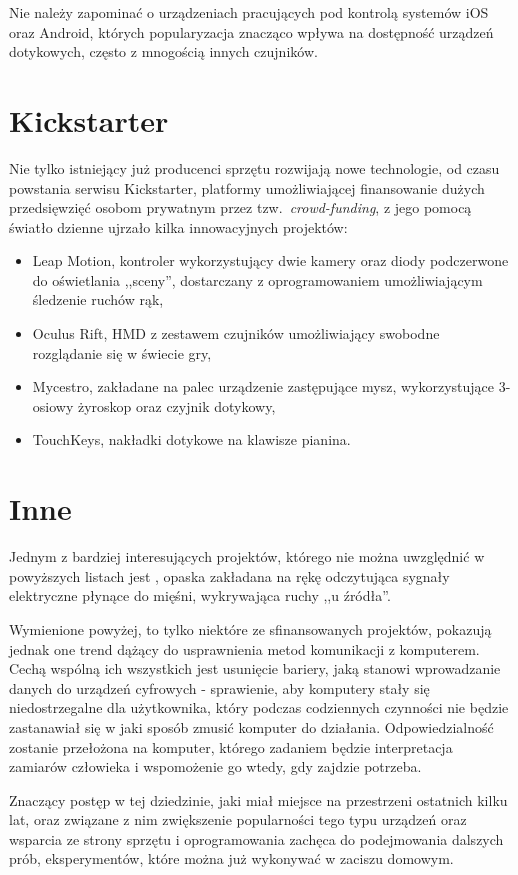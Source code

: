 Nie należy zapominać o urządzeniach pracujących pod kontrolą systemów iOS oraz Android, których popularyzacja znacząco wpływa na dostępność urządzeń dotykowych, często z mnogością innych czujników.\\

\section{Kickstarter}

Nie tylko istniejący już producenci sprzętu rozwijają nowe technologie, od czasu powstania serwisu Kickstarter, platformy umożliwiającej finansowanie dużych przedsięwzięć osobom prywatnym przez tzw.\ \textit{crowd-funding}, z jego pomocą światło dzienne ujrzało kilka innowacyjnych projektów:
\begin{itemize}
 \item Leap Motion, kontroler wykorzystujący dwie kamery oraz diody podczerwone do oświetlania ,,sceny'', dostarczany z oprogramowaniem umożliwiającym śledzenie ruchów rąk,
 \item Oculus Rift, HMD z zestawem czujników umożliwiający swobodne rozglądanie się w świecie gry,
 \item Mycestro, zakładane na palec urządzenie zastępujące mysz, wykorzystujące 3-osiowy żyroskop oraz czyjnik dotykowy,
 \item TouchKeys, nakładki dotykowe na klawisze pianina.\\
\end{itemize}

\section{Inne}

Jednym z bardziej interesujących projektów, którego nie można uwzględnić w powyższych listach jest , opaska zakładana na rękę odczytująca sygnały elektryczne płynące do mięśni, wykrywająca ruchy ,,u źródła''.

Wymienione powyżej, to tylko niektóre ze sfinansowanych projektów, pokazują jednak one trend dążący do usprawnienia metod komunikacji z komputerem. Cechą wspólną ich wszystkich jest usunięcie bariery, jaką stanowi wprowadzanie danych do urządzeń cyfrowych - sprawienie, aby komputery stały się niedostrzegalne dla użytkownika, który podczas codziennych czynności nie będzie zastanawiał się w jaki sposób zmusić komputer do działania. Odpowiedzialność zostanie przełożona na komputer, którego zadaniem będzie interpretacja zamiarów człowieka i wspomożenie go wtedy, gdy zajdzie potrzeba.

Znaczący postęp w tej dziedzinie, jaki miał miejsce na przestrzeni ostatnich kilku lat, oraz związane z nim zwiększenie popularności tego typu urządzeń oraz wsparcia ze strony sprzętu i oprogramowania zachęca do podejmowania dalszych prób, eksperymentów, które można już wykonywać w zaciszu domowym.
